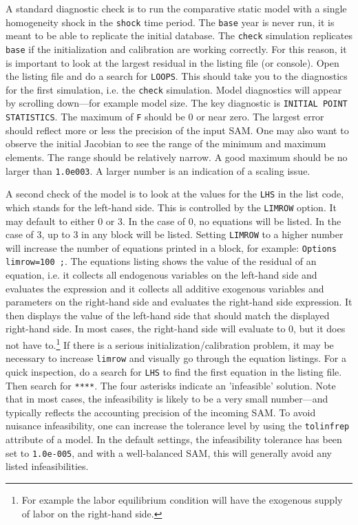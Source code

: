 A standard diagnostic check is to run the comparative static model with a single
homogeneity shock in the \texttt{shock} time period. The \texttt{base} year is
never run, it is meant to be able to replicate the initial database. The
\texttt{check} simulation replicates \texttt{base} if the initialization and
calibration are working correctly. For this reason, it is important to look at
the largest residual in the listing file (or console). Open the listing file and
do a search for \texttt{LOOPS}. This should take you to the diagnostics for the
first simulation, i.e. the \texttt{check} simulation. Model diagnostics will
appear by scrolling down---for example model size. The key diagnostic is
\texttt{INITIAL POINT STATISTICS}. The maximum of \texttt{F} should be 0 or near
zero. The largest error should reflect more or less the precision of the input
SAM. One may also want to observe the initial Jacobian to see the range of the
minimum and maximum elements. The range should be relatively narrow. A good
maximum should be no larger than \texttt{1.0e003}. A larger number is an
indication of a scaling issue.

A second check of the model is to look at the values for the \texttt{LHS} in the
list code, which stands for the left-hand side. This is controlled by the
\texttt{LIMROW} option. It may default to either 0 or 3. In the case of 0, no
equations will be listed. In the case of 3, up to 3 in any block will be listed.
Setting \texttt{LIMROW} to a higher number will increase the number of equations
printed in a block, for example: \texttt{Options limrow=100 ;}. The equations
listing shows the value of the residual of an equation, i.e. it collects all
endogenous variables on the left-hand side and evaluates the expression and it
collects all additive exogenous variables and parameters on the right-hand side
and evaluates the right-hand side expression. It then displays the value of the
left-hand side that should match the displayed right-hand side. In most cases,
the right-hand side will evaluate to 0, but it does not have to.\footnote{For
example the labor equilibrium condition will have the exogenous supply of labor
on the right-hand side.} If there is a serious initialization/calibration
problem, it may be necessary to increase \texttt{limrow} and visually go through
the equation listings. For a quick inspection, do a search for \texttt{LHS} to
find the first equation in the listing file. Then search for \texttt{****}. The
four asterisks indicate an 'infeasible' solution. Note that in most cases, the
infeasibility is likely to be a very small number---and typically reflects the
accounting precision of the incoming SAM. To avoid nuisance infeasibility, one
can increase the tolerance level by using the \texttt{tolinfrep} attribute of a
model. In the default settings, the infeasibility tolerance has been set to
\texttt{1.0e-005}, and with a well-balanced SAM, this will generally avoid any listed
infeasibilities.

